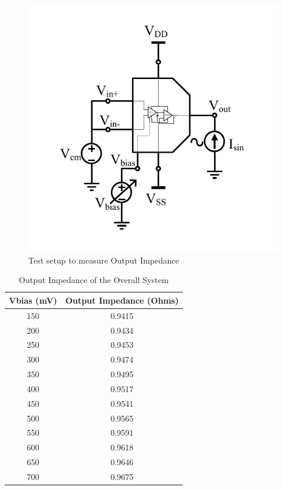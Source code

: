 \begin{figure} [H]
\centering
\includegraphics[scale=1]{Figures/Test_Benches/Overall/ZOUT.pdf}
\caption{Test setup to measure Output Impedance}
\end{figure}

\begin{table} [H]
\centering
\begin{tabular}{@{}cc@{}}
\toprule
Vbias (mV)			& Output Impedance (Ohms)	\\ \midrule
150					& 0.9415 \\
200					& 0.9434 \\
250					& 0.9453 \\
300					& 0.9474 \\
350					& 0.9495 \\
400					& 0.9517 \\
450					& 0.9541 \\
500					& 0.9565 \\
550					& 0.9591 \\
600					& 0.9618 \\
650					& 0.9646 \\
700 				& 0.9675 \\
\bottomrule
\end{tabular}
\caption{Output Impedance of the Overall System}
\end{table}


